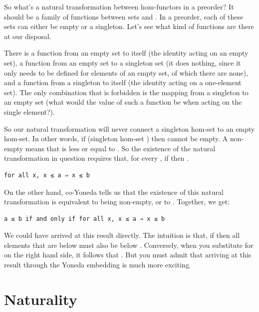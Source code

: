 So what's a natural transformation between hom-functors in a preorder?
It should be a family of functions between sets  and
. In a preorder, each of these sets can either be empty
or a singleton. Let's see what kind of functions are there at our
disposal.

There is a function from an empty set to itself (the identity acting on
an empty set), a function  from an empty set to a
singleton set (it does nothing, since it only needs to be defined for
elements of an empty set, of which there are none), and a function from
a singleton to itself (the identity acting on a one-element set). The
only combination that is forbidden is the mapping from a singleton to an
empty set (what would the value of such a function be when acting on the
single element?).

So our natural transformation will never connect a singleton hom-set to
an empty hom-set. In other words, if 
(singleton hom-set ) then  cannot be
empty. A non-empty  means that  is less or
equal to . So the existence of the natural transformation in
question requires that, for every , if
 then .

\begin{verbatim}
for all x, x ≤ a ⇒ x ≤ b
\end{verbatim}

On the other hand, co-Yoneda tells us that the existence of this natural
transformation is equivalent to  being non-empty, or to
. Together, we get:

\begin{verbatim}
a ≤ b if and only if for all x, x ≤ a ⇒ x ≤ b
\end{verbatim}

We could have arrived at this result directly. The intuition is that, if
 then all elements that are below 
must also be below . Conversely, when you substitute
 for  on the right hand side, it follows that
. But you must admit that arriving at this
result through the Yoneda embedding is much more exciting.

\section{Naturality}\label{naturality}


